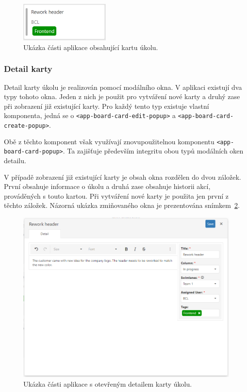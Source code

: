 \begin{figure}[H]
	\centering
	\label{img:card}
	\includegraphics[width=0.4\textwidth]{obrazky-figures/card.png}
	\caption{Ukázka části aplikace obsahující kartu úkolu.}
\end{figure}

\subsubsection*{Detail karty}
Detail karty úkolu je realizován pomocí modálního okna. V aplikaci existují dva typy tohoto okna. Jeden z nich je použit pro vytváření nové karty a druhý zase při zobrazení již existující karty. Pro každý tento typ existuje vlastní komponenta, jedná se o \texttt{<app-board-card-edit-popup>} a \texttt{<app-board-card-create-popup>}.

Obě z těchto komponent však využívají znovupoužitelnou komponentu \texttt{<app-board-card-popup>}. Ta zajišťuje především integritu obou typů modálních oken detailu.

V případě zobrazení již existující karty je obsah okna rozdělen do dvou záložek. První obsahuje informace o úkolu a druhá zase obsahuje historii akcí, prováděných s touto kartou. Při vytváření nové karty je použita jen první z těchto záložek. Názorná ukázka zmiňovaného okna je prezentována snímkem~\ref{img:card-detail}.

\begin{figure}[H]
	\centering
	\label{img:card-detail}
	\includegraphics[width=\textwidth]{obrazky-figures/card-detail.png}
	\caption{Ukázka části aplikace s otevřeným detailem karty úkolu.}
\end{figure}


